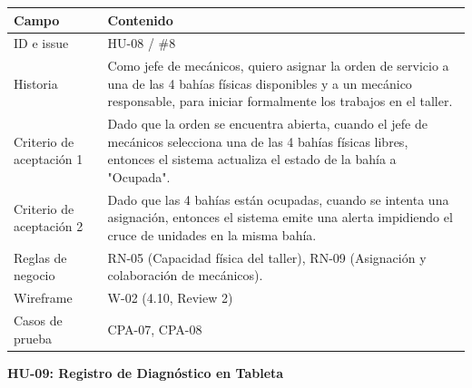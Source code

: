 {\def\LTcaptype{none} %
\begin{longtable}[]{@{}
  >{\raggedright\arraybackslash}p{}
  >{\raggedright\arraybackslash}p{}@{}}
\toprule\noalign{}
\begin{minipage}[b]{\linewidth}\raggedright
\textbf{Campo}
\end{minipage} & \begin{minipage}[b]{\linewidth}\raggedright
\textbf{Contenido}
\end{minipage} \\
\midrule\noalign{}
\endhead
\bottomrule\noalign{}
\endlastfoot
ID e issue & HU-08 / \#8 \\
Historia & Como jefe de mecánicos, quiero asignar la orden de servicio a
una de las 4 bahías físicas disponibles y a un mecánico responsable,
para iniciar formalmente los trabajos en el taller. \\
Criterio de aceptación 1 & Dado que la orden se encuentra abierta,
cuando el jefe de mecánicos selecciona una de las 4 bahías físicas
libres, entonces el sistema actualiza el estado de la bahía a
"Ocupada". \\
Criterio de aceptación 2 & Dado que las 4 bahías están ocupadas, cuando
se intenta una asignación, entonces el sistema emite una alerta
impidiendo el cruce de unidades en la misma bahía. \\
Reglas de negocio & RN-05 (Capacidad física del taller), RN-09
(Asignación y colaboración de mecánicos). \\
Wireframe & W-02 (4.10, Review 2) \\
Casos de prueba & CPA-07, CPA-08 \\
\end{longtable}
}

\textbf{HU-09: Registro de Diagnóstico en Tableta}

